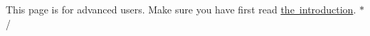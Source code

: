 This page is for advanced users. Make sure you have first read \mbox{\hyperlink{intro}{the introduction}}. $\ast$/ 